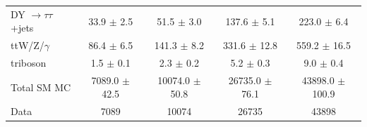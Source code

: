 \begin{table}[hbt]
\begin{center}
\begin{tabular}{l |  c  c  c  c}
                DY $\rightarrow \tau\tau$+jets   &      33.9 $\pm$ 2.5   &      51.5 $\pm$ 3.0   &     137.6 $\pm$ 5.1   &     223.0 $\pm$ 6.4  \\
                                ttW/Z/$\gamma$   &      86.4 $\pm$ 6.5   &     141.3 $\pm$ 8.2   &    331.6 $\pm$ 12.8   &    559.2 $\pm$ 16.5  \\
                                      triboson   &       1.5 $\pm$ 0.1   &       2.3 $\pm$ 0.2   &       5.2 $\pm$ 0.3   &       9.0 $\pm$ 0.4  \\
\hline
                                   Total SM MC   &   7089.0 $\pm$ 42.5   &  10074.0 $\pm$ 50.8   &  26735.0 $\pm$ 76.1   & 43898.0 $\pm$ 100.9  \\
\hline
                                          Data   &                7089   &               10074   &               26735   &               43898  \\
\hline

\end{tabular}
\end{center}
\end{table}

